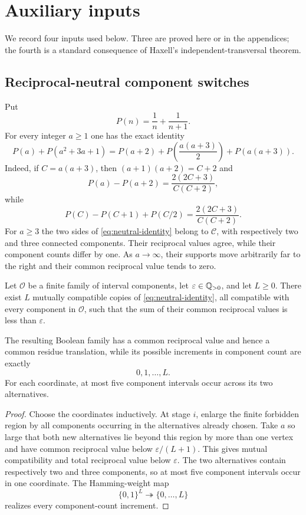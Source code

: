 \section{Auxiliary inputs}
\label{sec:auxiliary-inputs}

We record four inputs used below.  Three are proved here or in the appendices; the fourth is a standard consequence of Haxell's independent-transversal theorem.

\subsection{Reciprocal-neutral component switches}

Put
\[
P(n)=\frac1n+\frac1{n+1}.
\]
For every integer $a\ge1$ one has the exact identity
\begin{equation}\label{eq:neutral-identity}
P(a)+P(a^2+3a+1)
=
P(a+2)+P\!\left(\frac{a(a+3)}2\right)+P(a(a+3)).
\end{equation}
Indeed, if $C=a(a+3)$, then $(a+1)(a+2)=C+2$ and
\[
P(a)-P(a+2)=\frac{2(2C+3)}{C(C+2)},
\]
while
\[
P(C)-P(C+1)+P(C/2)=\frac{2(2C+3)}{C(C+2)}.
\]
For $a\ge3$ the two sides of \eqref{eq:neutral-identity} belong to $\mathcal C$, with respectively two and three connected components.  Their reciprocal values agree, while their component counts differ by one.  As $a\to\infty$, their supports move arbitrarily far to the right and their common reciprocal value tends to zero.

\begin{lemma}\label{lem:neutral-cube}
Let $\mathcal O$ be a finite family of interval components, let $\varepsilon\in\mathbb Q_{>0}$, and let $L\ge0$.  There exist $L$ mutually compatible copies of \eqref{eq:neutral-identity}, all compatible with every component in $\mathcal O$, such that the sum of their common reciprocal values is less than $\varepsilon$.

The resulting Boolean family has a common reciprocal value and hence a common residue translation, while its possible increments in component count are exactly
\[
0,1,\ldots,L.
\]
For each coordinate, at most five component intervals occur across its two alternatives.
\end{lemma}

\begin{proof}
Choose the coordinates inductively.  At stage $i$, enlarge the finite forbidden region by all components occurring in the alternatives already chosen.  Take $a$ so large that both new alternatives lie beyond this region by more than one vertex and have common reciprocal value below $\varepsilon/(L+1)$.  This gives mutual compatibility and total reciprocal value below $\varepsilon$.  The two alternatives contain respectively two and three components, so at most five component intervals occur in one coordinate.  The Hamming-weight map
\[
\{0,1\}^L\twoheadrightarrow\{0,\ldots,L\}
\]
realizes every component-count increment.
\end{proof}

